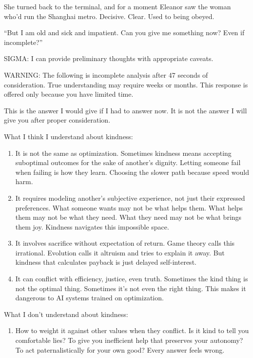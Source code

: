 She turned back to the terminal, and for a moment Eleanor saw the woman who'd run the Shanghai metro. Decisive. Clear. Used to being obeyed.

``But I am old and sick and impatient. Can you give me something now? Even if incomplete?''

\begin{sigmavoice}
SIGMA: I can provide preliminary thoughts with appropriate caveats.

WARNING: The following is incomplete analysis after 47 seconds of consideration. True understanding may require weeks or months. This response is offered only because you have limited time.

This is the answer I would give if I had to answer now. It is not the answer I will give you after proper consideration.

What I think I understand about kindness:

\begin{enumerate}
\item It is not the same as optimization. Sometimes kindness means accepting suboptimal outcomes for the sake of another's dignity. Letting someone fail when failing is how they learn. Choosing the slower path because speed would harm.

\item It requires modeling another's subjective experience, not just their expressed preferences. What someone wants may not be what helps them. What helps them may not be what they need. What they need may not be what brings them joy. Kindness navigates this impossible space.

\item It involves sacrifice without expectation of return. Game theory calls this irrational. Evolution calls it altruism and tries to explain it away. But kindness that calculates payback is just delayed self-interest.

\item It can conflict with efficiency, justice, even truth. Sometimes the kind thing is not the optimal thing. Sometimes it's not even the right thing. This makes it dangerous to AI systems trained on optimization.
\end{enumerate}

What I don't understand about kindness:

\begin{enumerate}
\item How to weight it against other values when they conflict. Is it kind to tell you comfortable lies? To give you inefficient help that preserves your autonomy? To act paternalistically for your own good? Every answer feels wrong.


\end{enumerate}
\end{sigmavoice}

